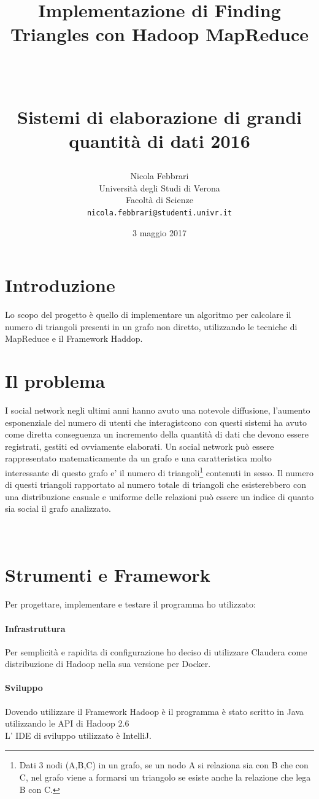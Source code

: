 \documentclass[paper=a4, fontsize=11pt]{scrartcl}	%
\title{ \vspace{-1in} 	\usefont{OT1}{bch}{b}{n}
		\huge \strut Implementazione di Finding Triangles con Hadoop MapReduce\strut \\
		\Large \bfseries \strut Sistemi di elaborazione di grandi quantità di dati 2016 \strut
}
\author{ 									\usefont{OT1}{bch}{m}{n}
        Nicola Febbrari\\		\usefont{OT1}{bch}{m}{n}
        Università degli Studi di Verona\\	\usefont{OT1}{bch}{m}{n}
        Facoltà di Scienze\\
        \texttt{nicola.febbrari@studenti.univr.it}
}
\date{3 maggio 2017}
\numberwithin{equation}{section}															%
\numberwithin{figure}{section}																%
\numberwithin{table}{section}																%
\begin{document}
\maketitle
\section{Introduzione}
Lo scopo del progetto è quello di implementare un algoritmo per calcolare il numero di triangoli presenti in un grafo non diretto, utilizzando le tecniche di MapReduce e il Framework Haddop.


\section{Il problema}
I social network negli ultimi anni hanno avuto una notevole diffusione, l'aumento esponenziale del numero di utenti che interagistcono con questi sistemi 
ha avuto come diretta conseguenza un  incremento della quantità di dati che devono essere registrati, gestiti ed ovviamente elaborati.
Un social network può essere rappresentato matematicamente da un grafo e una caratteristica molto interessante di questo grafo e' il numero di 
triangoli\footnote{Dati 3 nodi (A,B,C) in un grafo, se un nodo A si relaziona sia con B che con C, nel grafo viene a formarsi un triangolo se esiste anche la relazione che lega B con C.} 
contenuti in sesso. 
Il numero di questi triangoli rapportato al numero totale di triangoli che esisterebbero con una distribuzione casuale e uniforme delle relazioni può essere un indice di quanto sia social il grafo analizzato.\\
\\
\\
\section{Strumenti e Framework}
Per progettare, implementare e testare il programma ho utilizzato:
\paragraph{Infrastruttura}
Per semplicità e rapidita di configurazione ho deciso di utilizzare Claudera come distribuzione di Hadoop nella sua versione per Docker.

\paragraph{Sviluppo}
Dovendo utilizzare il Framework Hadoop è il programma è stato scritto in Java utilizzando le API di Hadoop 2.6\\
L' IDE di sviluppo utilizzato è IntelliJ.  
\end{document}
